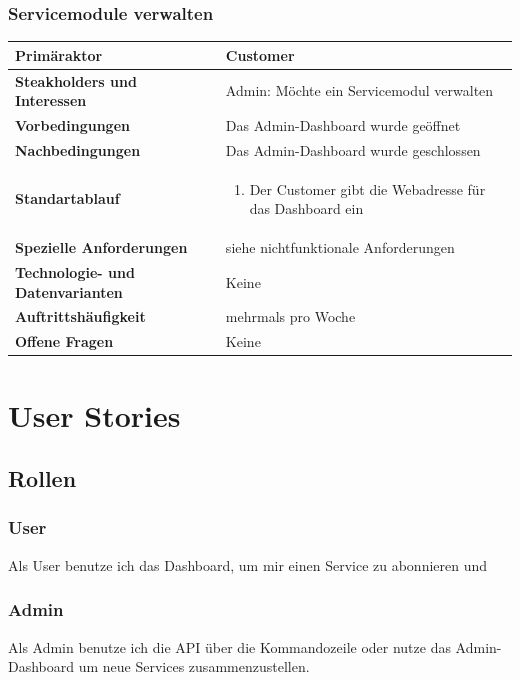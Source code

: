 \documentclass[11pt]{scrartcl}
\begin{document}
\subsubsection{Servicemodule verwalten}

\begin{longtabu} to \textwidth {X[1,l] X[2,l]}
	\bfseries Primäraktor & Customer  \\\hline 
	\bfseries Steakholders und Interessen & Admin: Möchte ein Servicemodul verwalten  \\\hline 
	\bfseries Vorbedingungen & Das Admin-Dashboard wurde geöffnet  \\\hline 
	\bfseries Nachbedingungen & Das Admin-Dashboard wurde geschlossen  \\\hline 
	\bfseries Standartablauf & 
		\begin{enumerate}
			\item Der Customer gibt die Webadresse für das Dashboard ein
			
		\end{enumerate}
      \\\hline
	\bfseries Spezielle Anforderungen & siehe nichtfunktionale Anforderungen  \\\hline 
	\bfseries Technologie- und Datenvarianten & Keine  \\\hline 
	\bfseries Auftrittshäufigkeit & mehrmals pro Woche  \\\hline 
	\bfseries Offene Fragen & Keine  \\\hline  
\end{longtabu}

\section{User Stories}
\subsection{Rollen}
\subsubsection{User}
Als User benutze ich das Dashboard, um mir einen Service zu abonnieren und 
\subsubsection{Admin}
Als Admin benutze ich die API über die Kommandozeile oder nutze das 
Admin-Dashboard um neue Services zusammenzustellen.
\end{document}
